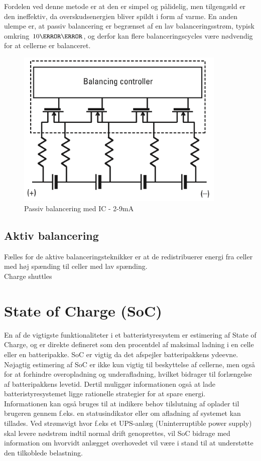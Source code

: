Fordelen ved denne metode er at den er simpel og pålidelig, men tilgengæld er den ineffektiv, da overskudsenergien bliver spildt i form af varme. En anden ulempe er, at passiv balancering er  begrænset af en lav balanceringsstrøm, typisk omkring $10\milli\ampere$, og derfor kan flere balanceringscycles være nødvendig for at cellerne er balanceret.

\begin{figure}[h]
	\centering
	\includegraphics[width=10cm]{billeder/passiv_balancering.png}
	\caption{Passiv balancering med IC - 2-9mA}
	\label{fig:passiv_balancering}
\end{figure}



\subsection{Aktiv balancering}
Fælles for de aktive balanceringsteknikker er at de redistribuerer energi fra celler med høj spænding til celler med lav spænding.
\\

Charge shuttles

\section{State of Charge (SoC)}
En af de vigtigste funktionaliteter i et batteristyresystem er estimering af State of Charge, og er direkte defineret som den procentdel af maksimal ladning i en celle eller en batteripakke. SoC er vigtig da det afspejler batteripakkens ydeevne. Nøjagtig estimering af SoC er ikke kun vigtig til beskyttelse af cellerne, men også for at forhindre overopladning og underafladning, hvilket bidrager til forlængelse af batteripakkens levetid. Dertil muliggør informationen også at lade batteristyresystemet ligge rationelle strategier for at spare energi.
\\
Informationen kan også bruges til at indikere behov tilslutning af oplader til brugeren gennem f.eks. en statusindikator eller om afladning af systemet kan tillades. 
Ved strømsvigt hvor f.eks et UPS-anlæg (Uninterruptible power supply) skal levere nødstrøm indtil normal drift genoprettes, vil SoC bidrage med information om hvorvidt anlægget overhovedet vil være i stand til at understøtte den tilkoblede belastning.
\\


